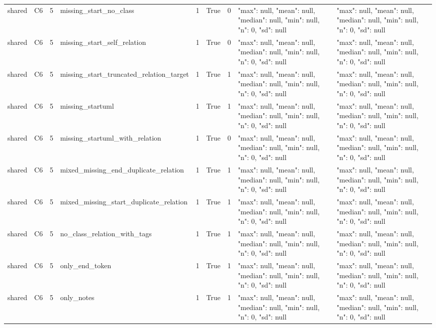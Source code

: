 \begin{tabular}{lllllllll}
shared & C6 & 5 & missing\_start\_no\_class & 1 & True & 0 & {"max": null, "mean": null, "median": null, "min": null, "n": 0, "sd": null} & {"max": null, "mean": null, "median": null, "min": null, "n": 0, "sd": null} \\
shared & C6 & 5 & missing\_start\_self\_relation & 1 & True & 0 & {"max": null, "mean": null, "median": null, "min": null, "n": 0, "sd": null} & {"max": null, "mean": null, "median": null, "min": null, "n": 0, "sd": null} \\
shared & C6 & 5 & missing\_start\_truncated\_relation\_target & 1 & True & 1 & {"max": null, "mean": null, "median": null, "min": null, "n": 0, "sd": null} & {"max": null, "mean": null, "median": null, "min": null, "n": 0, "sd": null} \\
shared & C6 & 5 & missing\_startuml & 1 & True & 1 & {"max": null, "mean": null, "median": null, "min": null, "n": 0, "sd": null} & {"max": null, "mean": null, "median": null, "min": null, "n": 0, "sd": null} \\
shared & C6 & 5 & missing\_startuml\_with\_relation & 1 & True & 0 & {"max": null, "mean": null, "median": null, "min": null, "n": 0, "sd": null} & {"max": null, "mean": null, "median": null, "min": null, "n": 0, "sd": null} \\
shared & C6 & 5 & mixed\_missing\_end\_duplicate\_relation & 1 & True & 1 & {"max": null, "mean": null, "median": null, "min": null, "n": 0, "sd": null} & {"max": null, "mean": null, "median": null, "min": null, "n": 0, "sd": null} \\
shared & C6 & 5 & mixed\_missing\_start\_duplicate\_relation & 1 & True & 1 & {"max": null, "mean": null, "median": null, "min": null, "n": 0, "sd": null} & {"max": null, "mean": null, "median": null, "min": null, "n": 0, "sd": null} \\
shared & C6 & 5 & no\_class\_relation\_with\_tags & 1 & True & 1 & {"max": null, "mean": null, "median": null, "min": null, "n": 0, "sd": null} & {"max": null, "mean": null, "median": null, "min": null, "n": 0, "sd": null} \\
shared & C6 & 5 & only\_end\_token & 1 & True & 1 & {"max": null, "mean": null, "median": null, "min": null, "n": 0, "sd": null} & {"max": null, "mean": null, "median": null, "min": null, "n": 0, "sd": null} \\
shared & C6 & 5 & only\_notes & 1 & True & 1 & {"max": null, "mean": null, "median": null, "min": null, "n": 0, "sd": null} & {"max": null, "mean": null, "median": null, "min": null, "n": 0, "sd": null} \\

\end{tabular}
